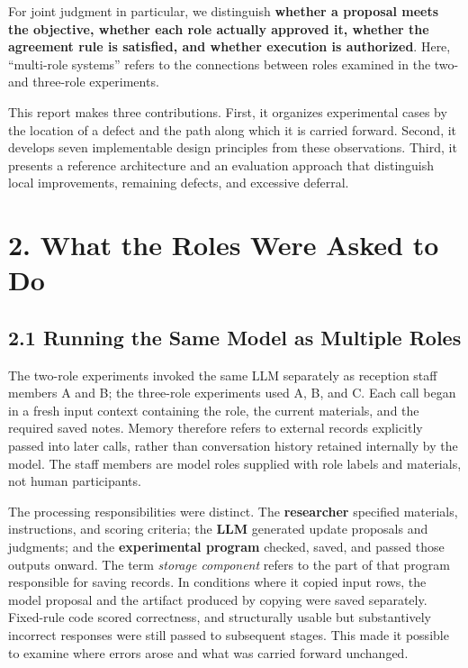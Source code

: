 \documentclass[10pt,a4paper]{article}
\newlength{\usable}
\begin{document}
For joint judgment in particular, we distinguish \textbf{whether a proposal meets the objective, whether each role actually approved it, whether the agreement rule is satisfied, and whether execution is authorized}. Here, ``multi-role systems'' refers to the connections between roles examined in the two- and three-role experiments.

This report makes three contributions. First, it organizes experimental cases by the location of a defect and the path along which it is carried forward. Second, it develops seven implementable design principles from these observations. Third, it presents a reference architecture and an evaluation approach that distinguish local improvements, remaining defects, and excessive deferral.

\section{2. What the Roles Were Asked to Do}\label{two-role-failure-design-what-the-roles-were-asked-to-do}

\subsection{2.1 Running the Same Model as Multiple Roles}\label{two-role-failure-design-running-the-same-model-as-multiple-roles}

The two-role experiments invoked the same LLM separately as reception staff members A and B; the three-role experiments used A, B, and C. Each call began in a fresh input context containing the role, the current materials, and the required saved notes. Memory therefore refers to external records explicitly passed into later calls, rather than conversation history retained internally by the model. The staff members are model roles supplied with role labels and materials, not human participants.

The processing responsibilities were distinct. The \textbf{researcher} specified materials, instructions, and scoring criteria; the \textbf{LLM} generated update proposals and judgments; and the \textbf{experimental program} checked, saved, and passed those outputs onward. The term \emph{storage component} refers to the part of that program responsible for saving records. In conditions where it copied input rows, the model proposal and the artifact produced by copying were saved separately. Fixed-rule code scored correctness, and structurally usable but substantively incorrect responses were still passed to subsequent stages. This made it possible to examine where errors arose and what was carried forward unchanged.
\end{document}
